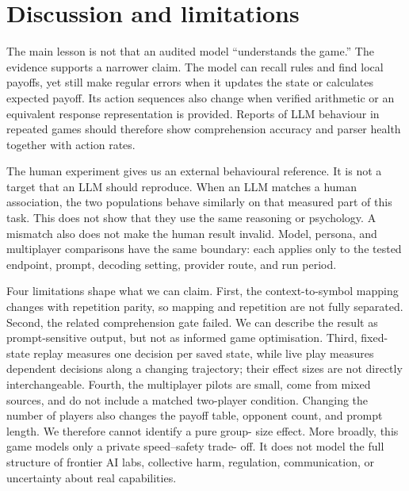 \documentclass[sigconf]{aamas}
\begin{document}
\section{Discussion and limitations}
\label{sec:discussion}

The main lesson is not that an audited model ``understands the game.'' The
evidence supports a narrower claim. The model can recall rules and find local
payoffs, yet still make regular errors when it updates the state or calculates
expected payoff. Its action sequences also change when verified arithmetic or
an equivalent response representation is provided. Reports of LLM behaviour
in repeated games should therefore show comprehension accuracy and parser
health together with action rates.

The human experiment gives us an external behavioural reference. It is not a
target that an LLM should reproduce. When an LLM matches a human association,
the two populations behave similarly on that measured part of this task. This
does not show that they use the same reasoning or psychology. A mismatch also
does not make the human result invalid. Model, persona, and multiplayer
comparisons have the same boundary: each applies only to the tested endpoint,
prompt, decoding setting, provider route, and run period.

Four limitations shape what we can claim. First, the context-to-symbol mapping
changes with repetition parity, so mapping and repetition are not fully
separated. Second, the related comprehension gate failed. We can describe the
result as prompt-sensitive output, but not as informed game optimisation.
Third, fixed-state replay measures one decision per saved state, while live
play measures dependent decisions along a changing trajectory; their effect
sizes are not directly interchangeable. Fourth, the multiplayer pilots are
small, come from mixed sources, and do not include a matched two-player
condition. Changing the number of players also changes the payoff table,
opponent count, and prompt length. We therefore cannot identify a pure group-
size effect. More broadly, this game models only a private speed--safety trade-
off. It does not model the full structure of frontier AI labs, collective
harm, regulation, communication, or uncertainty about real capabilities.

\end{document}
